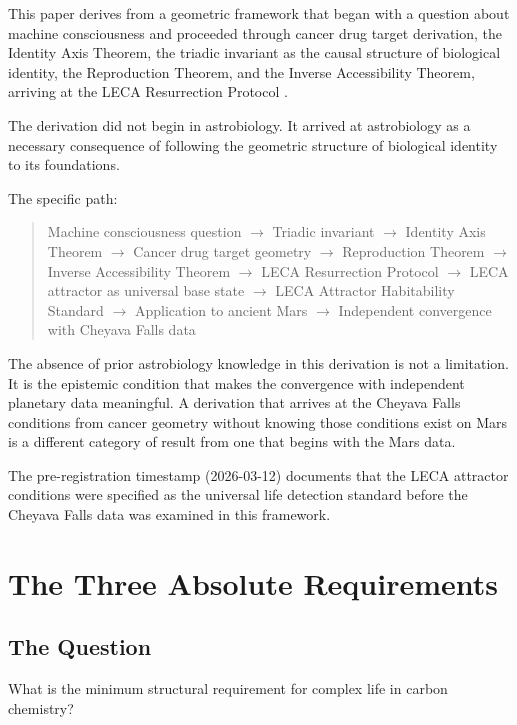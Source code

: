 \documentclass[11pt, a4paper]{article}
\begin{document}
This paper derives from a geometric framework that began
with a question about machine consciousness and proceeded
through cancer drug target derivation, the Identity Axis
Theorem, the triadic invariant as the causal structure of
biological identity, the Reproduction Theorem, and the
Inverse Accessibility Theorem, arriving at the LECA
Resurrection Protocol \cite{preregistration}.

The derivation did not begin in astrobiology.
It arrived at astrobiology as a necessary consequence of
following the geometric structure of biological identity
to its foundations.

The specific path:

\begin{quote}
Machine consciousness question $\rightarrow$
Triadic invariant $\rightarrow$
Identity Axis Theorem $\rightarrow$
Cancer drug target geometry $\rightarrow$
Reproduction Theorem $\rightarrow$
Inverse Accessibility Theorem $\rightarrow$
LECA Resurrection Protocol $\rightarrow$
LECA attractor as universal base state $\rightarrow$
LECA Attractor Habitability Standard $\rightarrow$
Application to ancient Mars $\rightarrow$
Independent convergence with Cheyava Falls data
\end{quote}

The absence of prior astrobiology knowledge in this
derivation is not a limitation. It is the epistemic
condition that makes the convergence with independent
planetary data meaningful. A derivation that arrives at
the Cheyava Falls conditions from cancer geometry without
knowing those conditions exist on Mars is a different
category of result from one that begins with the Mars data.

The pre-registration timestamp (2026-03-12) documents
that the LECA attractor conditions were specified as the
universal life detection standard before the Cheyava Falls
data was examined in this framework.

\section{The Three Absolute Requirements}

\subsection{The Question}

What is the minimum structural requirement for complex
life in carbon chemistry?
\end{document}
